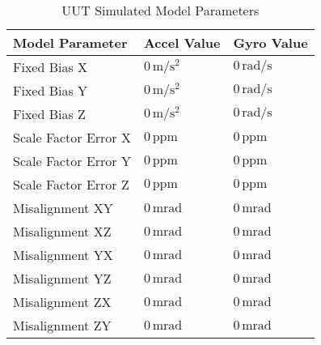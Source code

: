 \begin{table}[h!]
	\centering
	\begin{tabular}{|p{4cm}|p{3.5cm}|p{3.5cm}|}
		\hline
		\textbf{Model Parameter} & \textbf{Accel Value} & \textbf{Gyro Value} \\ \hline
		Fixed Bias X & $0 \,\unit{\meter\per\second\squared}$ & $0 \,\unit{\radian\per\second}$ \\ \hline
		Fixed Bias Y & $0 \,\unit{\meter\per\second\squared}$ & $0 \,\unit{\radian\per\second}$ \\ \hline
		Fixed Bias Z & $0 \,\unit{\meter\per\second\squared}$ & $0 \,\unit{\radian\per\second}$ \\ \hline
		Scale Factor Error X & $0 \,\textrm{ppm}$ & $0 \,\textrm{ppm}$ \\ \hline
		Scale Factor Error Y & $0 \,\textrm{ppm}$ & $0 \,\textrm{ppm}$ \\ \hline
		Scale Factor Error Z & $0 \,\textrm{ppm}$ & $0 \,\textrm{ppm}$ \\ \hline
		Misalignment XY & $0 \,\unit{\milli\radian}$ & $0 \,\unit{\milli\radian}$ \\ \hline
		Misalignment XZ & $0 \,\unit{\milli\radian}$ & $0 \,\unit{\milli\radian}$ \\ \hline
		Misalignment YX & $0 \,\unit{\milli\radian}$ & $0 \,\unit{\milli\radian}$ \\ \hline
		Misalignment YZ & $0 \,\unit{\milli\radian}$ & $0 \,\unit{\milli\radian}$ \\ \hline
		Misalignment ZX & $0 \,\unit{\milli\radian}$ & $0 \,\unit{\milli\radian}$ \\ \hline
		Misalignment ZY & $0 \,\unit{\milli\radian}$ & $0 \,\unit{\milli\radian}$ \\ \hline
	\end{tabular}
	\caption{UUT Simulated Model Parameters}
	\label{tab: UUT simulated model parameters}
\end{table}
\FloatBarrier

